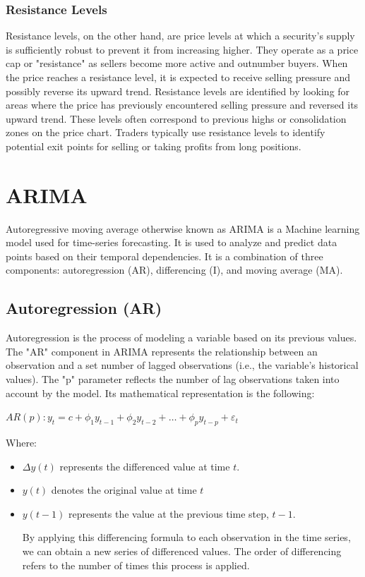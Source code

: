 \documentclass{imc-inf}
\begin{document}
			\subsubsection{Resistance Levels}
				Resistance levels, on the other hand, are price levels at which a security's supply is sufficiently robust to prevent it from increasing higher.
				They operate as a price cap or "resistance" as sellers become more active and outnumber buyers. When the price reaches a resistance level, 
				it is expected to receive selling pressure and possibly reverse its upward trend.
				Resistance levels are identified by looking for areas where the price has previously encountered selling pressure and reversed its upward trend.
				These levels often correspond to previous highs or consolidation zones on the price chart. Traders typically use resistance levels to identify
				potential exit points for selling or taking profits from long positions.
	\section{ARIMA}

	Autoregressive moving average otherwise known as ARIMA is a Machine learning model used  for  time-series forecasting. It is used to analyze and 
	predict data points based on their temporal dependencies. It is a combination of three components: autoregression (AR), differencing (I), 
	and moving average (MA). 
	\subsection{Autoregression (AR)}
		Autoregression \cite{autoregression} is the process of modeling a variable based on its previous values. The "AR" component in ARIMA
		represents the relationship between an observation and a set number of lagged observations (i.e., the variable's historical values).
		The "p" parameter reflects the number of lag observations taken into account by the model.
		Its mathematical representation is the following:

			$AR(p): y_t = c + \phi_1 y_{t-1} + \phi_2 y_{t-2} + \ldots + \phi_p y_{t-p} + \varepsilon_t$

		Where:
			\begin{itemize}
				\item $\Delta y(t)$ represents the differenced value at time $t$.

				\item $y(t)$ denotes the original value at time $t$
				\item $y(t-1)$ represents the value at the previous time step, $t-1$.

				By applying this differencing formula to each observation in the time series, we can obtain a new series of differenced values.
				 The order of differencing refers to the number of times this process is applied. 
			\end{itemize}
\end{document}
